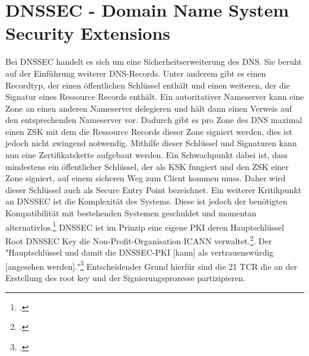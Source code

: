 \section{DNSSEC - Domain Name System Security Extensions}
\label{sec:dnssec}
	Bei \ac{DNSSEC} handelt es sich um eine Sicherheitserweiterung des \ac{DNS}.
	Sie beruht auf der Einführung weiterer \ac{DNS}-Records.
	Unter anderem gibt es einen Recordtyp, der einen öffentlichen Schlüssel enthält und einen weiteren, der die Signatur eines Ressource Records enthält.
	Ein autoritativer Nameserver kann eine Zone an einen anderen Nameserver delegieren und hält dann einen Verweis auf den entsprechenden Nameserver vor.
	Dadurch gibt es pro Zone des \ac{DNS} maximal einen \ac{ZSK} mit dem die Ressource Records dieser Zone signiert werden, dies ist jedoch nicht zwingend notwendig.
	Mithilfe dieser Schlüssel und Signaturen kann nun eine Zertifikatskette aufgebaut werden.
	Ein Schwachpunkt dabei ist, dass mindestens ein öffentlicher Schlüssel, der als \ac{KSK} fungiert und den \ac{ZSK} einer Zone signiert, auf einem sicheren Weg zum Client kommen muss.
	Daher wird dieser Schlüssel auch als Secure Entry Point bezeichnet.
	Ein weiterer Kritikpunkt an \ac{DNSSEC} ist die Komplexität des Systems.
	Diese ist jedoch der benötigten Kompatibilität mit bestehenden Systemen geschuldet und momentan alternativlos.\footcite[Vgl.][S. 195]{Sorge2013}
		\ac{DNSSEC} ist im Prinzip eine eigene \ac{PKI} deren Hauptschlüssel Root DNSSEC Key die Non-Profit-Organisation \ac{ICANN} verwaltet.\footcite{Koetter2014}. Der "Hauptschlüssel und damit die \ac{DNSSEC}-\ac{PKI} [kann] als vertrauenswürdig [angesehen werden]."\footcite{Koetter2014} Entscheidender Grund hierfür sind die 21 \ac{TCR} die an der Erstellung des root key und der Signierungsprozesse partizipieren.

